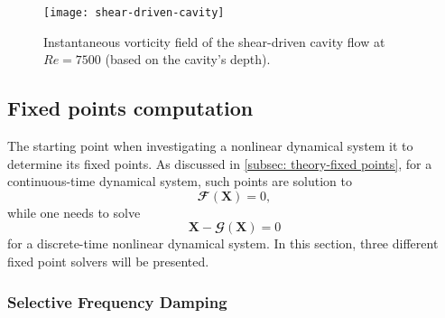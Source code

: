 \begin{figure}[b]
  \centering
  \texttt{[image: shear-driven-cavity]}
  \caption{Instantaneous vorticity field of the shear-driven cavity flow at $Re=7500$ (based on the cavity's depth).}
  \label{fig: numerics -- shear-driven cavity flow}
\end{figure}






  \subsection{Fixed points computation}
  \label{subsec: numerics-fixed points computation}

  The starting point when investigating a nonlinear dynamical system it to determine its fixed points. As discussed in \textsection \ref{subsec: theory-fixed points}, for a continuous-time dynamical system, such points are solution to
  \begin{equation}
    \mathbfcal{F} \left( \mathbf{X} \right) = 0,
    \label{eq: numerics -- continuous-time fixed point}
  \end{equation}
  while one needs to solve
  \begin{equation}
    \mathbf{X} - \mathbfcal{G} \left( \mathbf{X} \right) = 0
    \label{eq: numerics -- discrete-time fixed point}
  \end{equation}
  for a discrete-time nonlinear dynamical system. In this section, three different fixed point solvers will be presented.

    \subsubsection{Selective Frequency Damping}
    \label{subsubsec: numerics -- selective frequency damping}

